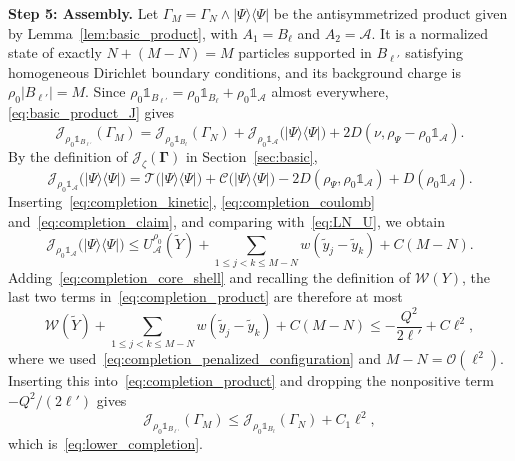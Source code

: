 \documentclass[final,reqno]{amsart}
\theoremstyle{remark}
\theoremstyle{definition}
\renewcommand{\le}{\leqslant}
\newcommand{\iden}{\mathbb{1}}
\newcommand{\TC}{\mathcal{T}}
\newcommand{\Cc}{\mathcal{C}}
\newcommand{\vGamma}{{\bm{\Gamma}}}
\begin{document}
\noindent\textbf{Step 5: Assembly.}
Let $\Gamma_M=\Gamma_N\wedge|\Psi\rangle\langle\Psi|$ be the antisymmetrized product given by Lemma~\ref{lem:basic_product}, with $A_1=B_\ell$ and $A_2=\mathcal A$. It is a normalized state of exactly $N+(M-N)=M$ particles supported in $B_{\ell'}$ satisfying homogeneous Dirichlet boundary conditions, and its background charge is $\rho_0|B_{\ell'}|=M$. Since $\rho_0\iden_{B_{\ell'}}=\rho_0\iden_{B_\ell}+\rho_0\iden_{\mathcal A}$ almost everywhere, \eqref{eq:basic_product_J} gives
\begin{equation}\label{eq:completion_product}
\mathcal J_{\rho_0\iden_{B_{\ell'}}}(\Gamma_M)
=\mathcal J_{\rho_0\iden_{B_\ell}}(\Gamma_N)
+\mathcal J_{\rho_0\iden_{\mathcal A}}\big(|\Psi\rangle\langle\Psi|\big)
+2D(\nu,\rho_\Psi-\rho_0\iden_{\mathcal A}).
\end{equation}
By the definition of $\mathcal J_\zeta(\vGamma)$ in Section~\ref{sec:basic},
\[
\mathcal J_{\rho_0\iden_{\mathcal A}}\big(|\Psi\rangle\langle\Psi|\big)
=\TC\big(|\Psi\rangle\langle\Psi|\big)+\Cc\big(|\Psi\rangle\langle\Psi|\big)
-2D(\rho_\Psi,\rho_0\iden_{\mathcal A})+D(\rho_0\iden_{\mathcal A}).
\]
Inserting~\eqref{eq:completion_kinetic}, \eqref{eq:completion_coulomb} and~\eqref{eq:completion_claim}, and comparing with~\eqref{eq:LN_U}, we obtain
\[
\mathcal J_{\rho_0\iden_{\mathcal A}}\big(|\Psi\rangle\langle\Psi|\big)
\le U^{\rho_0}_{\mathcal A}(\widetilde Y)+\sum_{1\le j<k\le M-N}w(\tilde y_j-\tilde y_k)+C(M-N).
\]
Adding~\eqref{eq:completion_core_shell} and recalling the definition of $\mathcal W(Y)$, the last two terms in~\eqref{eq:completion_product} are therefore at most
\[
\mathcal W(\widetilde Y)+\sum_{1\le j<k\le M-N}w(\tilde y_j-\tilde y_k)+C(M-N)
\le-\frac{Q^2}{2\ell'}+C\ell^2,
\]
where we used~\eqref{eq:completion_penalized_configuration} and $M-N=\mathcal O(\ell^2)$. Inserting this into~\eqref{eq:completion_product} and dropping the nonpositive term $-Q^2/(2\ell')$ gives
\[
\mathcal J_{\rho_0\iden_{B_{\ell'}}}(\Gamma_M)
\le\mathcal J_{\rho_0\iden_{B_\ell}}(\Gamma_N)+C_1\ell^2,
\]
which is~\eqref{eq:lower_completion}.
\end{document}
